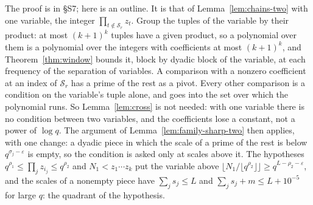\documentclass[11pt]{article}
\theoremstyle{definition}
\begin{document}
The proof is in \S S7; here is an outline. It is that of Lemma~\ref{lem:chains-two} with one variable, the integer
$\prod_{t \notin \mathcal S_r} z_t$. Group the tuples of the variable by their product: at most $(k + 1)^k$ tuples have a
given product, so a polynomial over them is a polynomial over the integers with coefficients at most $(k + 1)^k$, and
Theorem~\ref{thm:window} bounds it, block by dyadic block of the variable, at each frequency of the separation of
variables. A
comparison with a nonzero coefficient at an index of $\mathcal S_r$ has a prime of the rest as a pivot. Every other
comparison is a condition on the variable's tuple alone, and goes into the set over which the polynomial runs. So
Lemma~\ref{lem:cross} is not needed: with one variable there is no condition between two variables, and the
coefficients lose a constant, not a power of $\log q$. The argument of Lemma~\ref{lem:family-sharp-two} then applies,
with one change: a dyadic piece in which the scale of a prime of the rest is below $q^{\sigma_j - \varepsilon}$ is
empty, so the condition is asked only at scales above it. The hypotheses $q^{\rho_1} \le \prod_j z_{i_j} \le q^{\rho_2}$
and $N_1 < z_1 \cdots z_k$ put the variable above $\lfloor N_1/\lfloor q^{\rho_2} \rfloor \rfloor \ge q^{L - \rho_2 -
\varepsilon}$, and the scales of a nonempty piece have $\sum_j s_j \le L$ and $\sum_j s_j + m \le L + 10^{-5}$ for large
$q$: the quadrant of the hypothesis.
\end{document}
